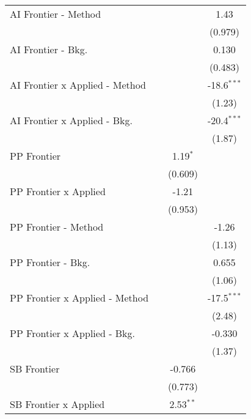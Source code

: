 \begin{tabular}{lccc}
   AI Frontier - Method           &           &               & 1.43\\   
                                  &           &               & (0.979)\\   
   AI Frontier - Bkg.             &           &               & 0.130\\   
                                  &           &               & (0.483)\\   
   AI Frontier x Applied - Method &           &               & -18.6$^{***}$\\   
                                  &           &               & (1.23)\\   
   AI Frontier x Applied - Bkg.   &           &               & -20.4$^{***}$\\   
                                  &           &               & (1.87)\\   
   PP Frontier                    &           & 1.19$^{*}$    &   \\   
                                  &           & (0.609)       &   \\   
   PP Frontier x Applied          &           & -1.21         &   \\   
                                  &           & (0.953)       &   \\   
   PP Frontier - Method           &           &               & -1.26\\   
                                  &           &               & (1.13)\\   
   PP Frontier - Bkg.             &           &               & 0.655\\   
                                  &           &               & (1.06)\\   
   PP Frontier x Applied - Method &           &               & -17.5$^{***}$\\   
                                  &           &               & (2.48)\\   
   PP Frontier x Applied - Bkg.   &           &               & -0.330\\   
                                  &           &               & (1.37)\\   
   SB Frontier                    &           & -0.766        &   \\   
                                  &           & (0.773)       &   \\   
   SB Frontier x Applied          &           & 2.53$^{**}$   &   \\   

\end{tabular}
